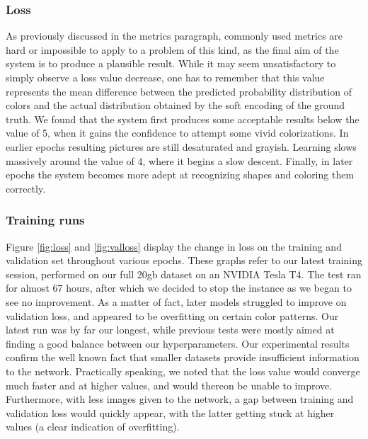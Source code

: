 \documentclass[twoside,twocolumn]{article}
\begin{document}
\subsubsection{Loss}

As previously discussed in the metrics paragraph, commonly used metrics are hard or impossible to apply to a problem of this kind, as the final aim of the system is to produce a plausible result. While it may seem unsatisfactory to simply observe a loss value decrease, one has to remember that this value represents the mean difference between the predicted probability distribution of colors and the actual distribution obtained by the soft encoding of the ground truth.
We found that the system first produces some acceptable results below the value of 5, when it gains the confidence to attempt some vivid colorizations. In earlier epochs resulting pictures are still desaturated and grayish. Learning slows massively around the value of 4, where it begins a slow descent. Finally, in later epochs the system becomes more adept at recognizing shapes and coloring them correctly.

\subsubsection{Training runs}

Figure \ref{fig:loss} and \ref{fig:valloss} display the change in loss on the training and validation set throughout various epochs. These graphs refer to our latest training session, performed on our full 20gb dataset on an NVIDIA Tesla T4. The test ran for almost 67 hours, after which we decided to stop the instance as we began to see no improvement. As a matter of fact, later models struggled to improve on validation loss, and appeared to be overfitting on certain color patterns.
Our latest run was by far our longest, while previous tests were mostly aimed at finding a good balance between our hyperparameters. Our experimental results confirm the well known fact that smaller datasets provide insufficient information to the network. Practically speaking, we noted that the loss value would converge much faster and at higher values, and would thereon be unable to improve. Furthermore, with less images given to the network, a gap between training and validation loss would quickly appear, with the latter getting stuck at higher values (a clear indication of overfitting).
\end{document}
